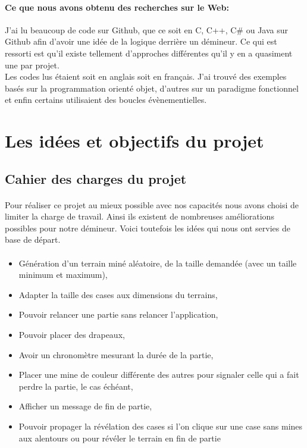 \documentclass[12pt, a4paper]{article}
\begin{document}
\paragraph{Ce que nous avons obtenu des recherches sur le Web:}
J'ai lu beaucoup de code sur Github, que ce soit en C, C++, C\# ou Java sur
Github afin d'avoir une idée de la logique derrière un démineur. Ce qui est
ressorti est qu'il existe tellement d'approches différentes qu'il y en a
quasiment une par projet. \\
Les codes lus étaient soit en anglais soit en français. J'ai trouvé des
exemples basés sur la programmation orienté objet, d'autres sur un paradigme
fonctionnel et enfin certains utilisaient des boucles évènementielles.


\newpage

\section{Les idées et objectifs du projet}

\subsection{Cahier des charges du projet}

\paragraph{}
Pour réaliser ce projet au mieux possible avec nos capacités nous avons choisi
de limiter la charge de travail. Ainsi ils existent de nombreuses améliorations
possibles pour notre démineur. Voici toutefois les idées qui nous ont servies
de base de départ.

\paragraph{}

\begin{itemize}
\item Génération d'un terrain miné aléatoire, de la taille demandée
(avec un taille minimum et maximum),
\item Adapter la taille des cases aux dimensions du terrains,
\item Pouvoir relancer une partie sans relancer l'application,
\item Pouvoir placer des drapeaux,
\item Avoir un chronomètre mesurant la durée de la partie,
\item Placer une mine de couleur différente des autres pour signaler celle qui
a fait perdre la partie, le cas échéant,
\item Afficher un message de fin de partie,
\item Pouvoir propager la révélation des cases si l'on clique sur une case sans
mines aux alentours ou pour révéler le terrain en fin de partie
\end{itemize}
\end{document}
